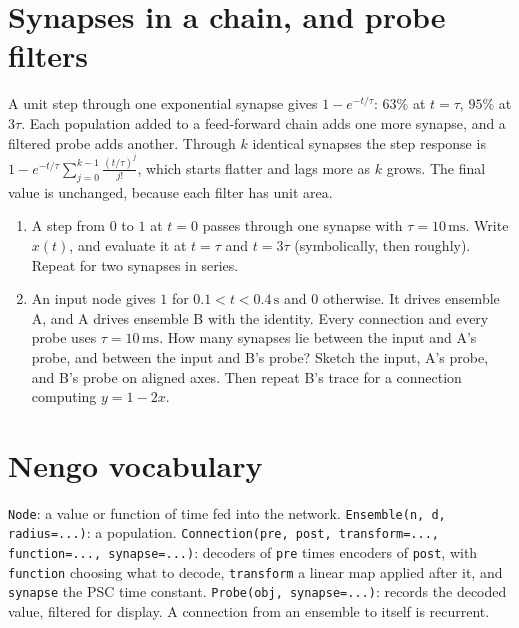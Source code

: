 \documentclass[11pt,letterpaper]{article}
\begin{document}
\section{Synapses in a chain, and probe filters}

\begin{idea}
A unit step through one exponential synapse gives $1 - e^{-t/\tau}$: $63\%$ at $t = \tau$, $95\%$ at $3\tau$. Each population added to a feed-forward chain adds one more synapse, and a filtered probe adds another. Through $k$ identical synapses the step response is $1 - e^{-t/\tau}\sum_{j=0}^{k-1}\frac{(t/\tau)^j}{j!}$, which starts flatter and lags more as $k$ grows. The final value is unchanged, because each filter has unit area.
\end{idea}

\begin{enumerate}
\item A step from $0$ to $1$ at $t = 0$ passes through one synapse with $\tau = 10\,\mathrm{ms}$. Write $x(t)$, and evaluate it at $t = \tau$ and $t = 3\tau$ (symbolically, then roughly). Repeat for two synapses in series.
\item An input node gives $1$ for $0.1 < t < 0.4\,\mathrm{s}$ and $0$ otherwise. It drives ensemble A, and A drives ensemble B with the identity. Every connection and every probe uses $\tau = 10\,\mathrm{ms}$. How many synapses lie between the input and A's probe, and between the input and B's probe? Sketch the input, A's probe, and B's probe on aligned axes. Then repeat B's trace for a connection computing $y = 1 - 2x$.
\end{enumerate}

\section{Nengo vocabulary}

\begin{idea}
\texttt{Node}: a value or function of time fed into the network. \texttt{Ensemble(n, d, radius=...)}: a population. \texttt{Connection(pre, post, transform=..., function=..., synapse=...)}: decoders of \texttt{pre} times encoders of \texttt{post}, with \texttt{function} choosing what to decode, \texttt{transform} a linear map applied after it, and \texttt{synapse} the PSC time constant. \texttt{Probe(obj, synapse=...)}: records the decoded value, filtered for display. A connection from an ensemble to itself is recurrent.
\end{idea}
\end{document}
